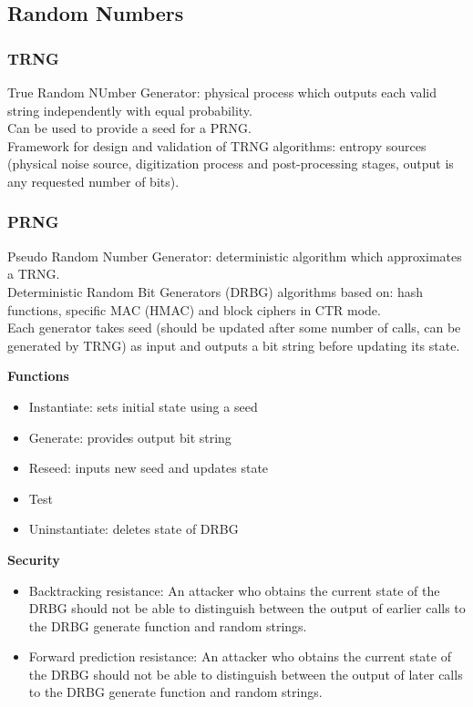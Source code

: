 \documentclass{article}
\begin{document}
\subsection{Random Numbers}

\subsubsection{TRNG}

True Random NUmber Generator: physical process which outputs each valid string independently with equal probability.\\
Can be used to provide a seed for a PRNG.\\
Framework for design and validation of TRNG algorithms: entropy sources (physical noise source, digitization process and post-processing stages, output is any requested number of bits).

\subsubsection{PRNG}

Pseudo Random Number Generator: deterministic algorithm which approximates a TRNG.\\
Deterministic Random Bit Generators (DRBG) algorithms based on: hash functions, specific MAC (HMAC) and block ciphers in CTR mode.\\
Each generator takes seed (should be updated after some number of calls, can be generated by TRNG) as input and outputs a bit string before updating its state.

\textbf{Functions}
\begin{itemize}
    \item Instantiate: sets initial state using a seed
    \item Generate: provides output bit string
    \item Reseed: inputs new seed and updates state
    \item Test
    \item Uninstantiate: deletes state of DRBG
\end{itemize}

\textbf{Security}

\begin{itemize}
    \item Backtracking resistance: An attacker who obtains the current state of the DRBG should not be able to distinguish between the output of earlier calls to the DRBG generate function and random strings.
    \item Forward prediction resistance: An attacker who obtains the current state of the DRBG should not be able to distinguish between the output of later calls to the DRBG generate function and random strings.
\end{itemize}
\end{document}
